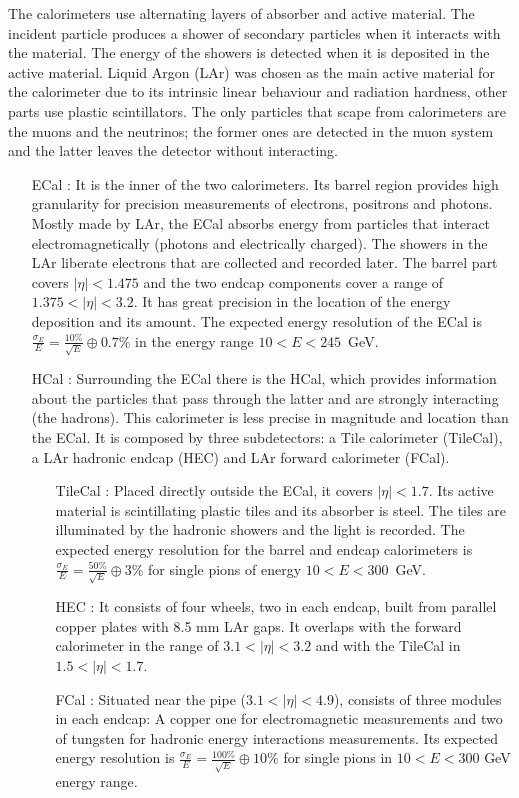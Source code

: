 The calorimeters use alternating layers of absorber and active material. The incident particle produces a shower of secondary particles when it interacts with the material. The energy of the showers is detected when it is deposited in the active material. Liquid Argon (LAr) was chosen as the main active material for the calorimeter due to its intrinsic linear behaviour and radiation hardness, other parts use plastic scintillators. The only particles that scape from calorimeters are the muons and the neutrinos; the former ones are detected in the muon system and the latter leaves the detector without interacting.
\begin{itemize}
\item[ECal]: It is the inner of the two calorimeters. Its barrel region provides high granularity for precision measurements of electrons, positrons and photons. Mostly made by LAr, the ECal absorbs energy from particles that interact electromagnetically (photons and electrically charged). The showers in the LAr liberate electrons that are collected and recorded later. The barrel part covers $|\eta|<1.475$ and the two endcap components cover a range of $1.375<|\eta|<3.2$. It has great precision in the location of the energy deposition and its amount. The expected energy resolution of the ECal is $\frac{\sigma_E}{E}=\frac{10 \%}{\sqrt{E}} \oplus 0.7 \%$ in the energy range $10 < E< 245$~GeV.

\item[HCal]: Surrounding the ECal there is the HCal, which provides information about the particles that pass through the latter and are strongly interacting (the hadrons). This calorimeter is less precise in magnitude and location than the ECal. It is composed by three subdetectors: a Tile calorimeter (TileCal), a LAr hadronic endcap (HEC) and LAr forward calorimeter (FCal).
\begin{itemize}
\item[TileCal]: Placed directly outside the ECal, it covers $|\eta|< 1.7$. Its active material is scintillating plastic tiles and its absorber is steel. The tiles are illuminated by the hadronic showers and the light is recorded. The expected energy resolution for the barrel and endcap calorimeters is $\frac{\sigma_E}{E}=\frac{50 \%}{\sqrt{E}} \oplus 3 \%$ for single pions of energy $10 < E< 300$~GeV.
\item[HEC]: It consists of four wheels, two in each endcap, built from parallel copper plates with 8.5 mm LAr gaps. It overlaps with the forward calorimeter in the range of $3.1 <|\eta|<3.2$ and with the TileCal in $1.5 <|\eta|<1.7$.
\item[FCal]: Situated near the pipe ($3.1<|\eta|<4.9$), consists of three modules in each endcap: A copper one for electromagnetic measurements and two of tungsten for hadronic energy interactions measurements. Its expected energy resolution is $\frac{\sigma_E}{E}=\frac{100 \%}{\sqrt{E}} \oplus 10 \%$ for single pions in $10 < E< 300$ GeV energy range.
\end{itemize}
\end{itemize}
 

